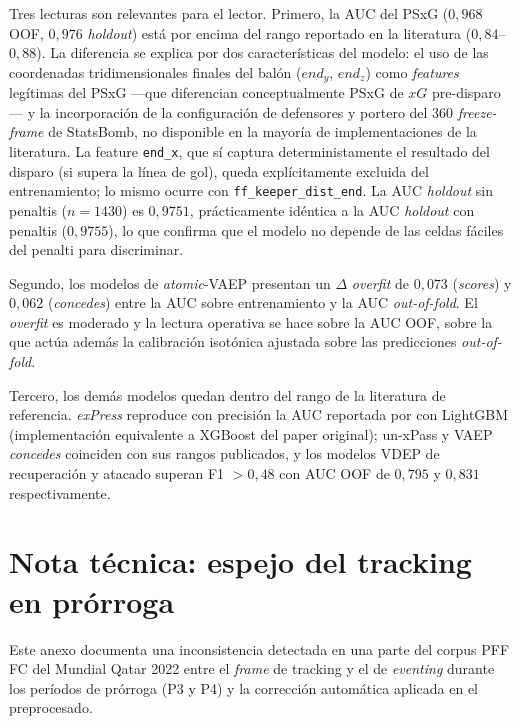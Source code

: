 Tres lecturas son relevantes para el lector. Primero, la AUC del
PSxG ($0{,}968$ OOF, $0{,}976$ \textit{holdout}) está por encima del
rango reportado en la literatura ($0{,}84$--$0{,}88$). La diferencia
se explica por dos características del modelo: el uso de las
coordenadas tridimensionales finales del balón ($end_y$, $end_z$)
como \textit{features} legítimas del PSxG ---que diferencian
conceptualmente PSxG de $xG$ pre-disparo--- y la incorporación de la
configuración de defensores y portero del 360 \textit{freeze-frame}
de StatsBomb, no disponible en la mayoría de implementaciones de la
literatura. La feature \texttt{end\_x}, que sí captura
deterministamente el resultado del disparo (si supera la línea de
gol), queda explícitamente excluida del entrenamiento; lo mismo
ocurre con \texttt{ff\_keeper\_dist\_end}. La AUC \textit{holdout}
sin penaltis ($n=1430$) es $0{,}9751$, prácticamente idéntica a la
AUC \textit{holdout} con penaltis ($0{,}9755$), lo que confirma que
el modelo no depende de las celdas fáciles del penalti para
discriminar.

Segundo, los modelos de \textit{atomic}-VAEP presentan un
$\Delta$ \textit{overfit} de $0{,}073$ (\textit{scores}) y $0{,}062$
(\textit{concedes}) entre la AUC sobre entrenamiento y la AUC
\textit{out-of-fold}. El \textit{overfit} es moderado y la lectura
operativa se hace sobre la AUC OOF, sobre la que actúa además la
calibración isotónica ajustada sobre las predicciones
\textit{out-of-fold}.

Tercero, los demás modelos quedan dentro del rango de la literatura
de referencia. \textit{exPress} reproduce con precisión la AUC
reportada por \textcite{Lee2025exPress} con LightGBM
(implementación equivalente a XGBoost del paper original); un-xPass
y VAEP \textit{concedes} coinciden con sus rangos publicados, y los
modelos VDEP de recuperación y atacado superan F1 $> 0{,}48$ con
AUC OOF de $0{,}795$ y $0{,}831$ respectivamente.


\chapter{Nota técnica: espejo del tracking en prórroga}
\label{anexo:espejo-prorroga}

Este anexo documenta una inconsistencia detectada en una parte del
corpus PFF FC del Mundial Qatar 2022 entre el \textit{frame} de
tracking y el de \textit{eventing} durante los períodos de prórroga
(P3 y P4) y la corrección automática aplicada en el preprocesado.

